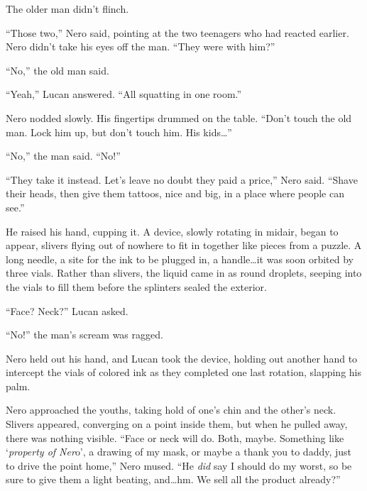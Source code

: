 The older man didn't flinch.



``Those two,'' Nero said, pointing at the two teenagers who had reacted earlier.  Nero didn't take his eyes off the man.  ``They were with him?''



``No,'' the old man said.



``Yeah,'' Lucan answered.  ``All squatting in one room.''



Nero nodded slowly.  His fingertips drummed on the table.  ``Don't touch the old man.  Lock him up, but don't touch him.  His kids\ldots''



``No,'' the man said.  ``No!''



``They take it instead.  Let's leave no doubt they paid a price,'' Nero said.  ``Shave their heads, then give them tattoos, nice and big, in a place where people can see.''



He raised his hand, cupping it.  A device, slowly rotating in midair, began to appear, slivers flying out of nowhere to fit in together like pieces from a puzzle.  A long needle, a site for the ink to be plugged in, a handle\ldots  it was soon orbited by three vials.  Rather than slivers, the liquid came in as round droplets, seeping into the vials to fill them before the splinters sealed the exterior.



``Face?  Neck?'' Lucan asked.



``No!'' the man's scream was ragged.



Nero held out his hand, and Lucan took the device, holding out another hand to intercept the vials of colored ink as they completed one last rotation, slapping his palm.



Nero approached the youths, taking hold of one's chin and the other's neck.  Slivers appeared, converging on a point inside them, but when he pulled away, there was nothing visible.  ``Face or neck will do.  Both, maybe.  Something like `\emph{property of Ner}o', a drawing of my mask, or maybe a thank you to daddy, just to drive the point home,'' Nero mused.  ``He \emph{did} say I should do my worst, so be sure to give them a light beating, and\ldots hm.  We sell all the product already?''



